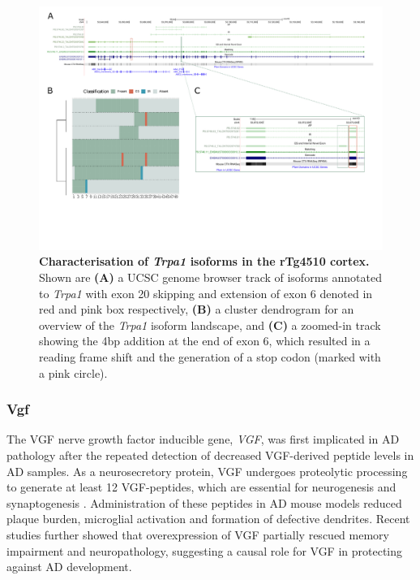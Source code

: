 \begin{landscape}
	\begin{figure}[htp]
		\centering
		\includegraphics[page=13,trim={0 5cm 0 0},scale = 0.85]{Figures/TargetGenes_Annotation_Landscape.pdf}
		\captionsetup{width=1.3\textwidth}
		\caption[Characterisation of the \textit{Trpa1} isoform landscape]%
		{\textbf{Characterisation of \textit{Trpa1} isoforms in the rTg4510 cortex.} Shown are \textbf{(A)} a UCSC genome browser track of isoforms annotated to \textit{Trpa1} with exon 20 skipping and extension of exon 6 denoted in red and pink box respectively, \textbf{(B)} a cluster dendrogram for an overview of the \textit{Trpa1} isoform landscape, and \textbf{(C)} a zoomed-in track showing the 4bp addition at the end of exon 6, which resulted in a reading frame shift and the generation of a stop codon (marked with a pink circle).}   
		\label{fig:trpa1}
	\end{figure}
\end{landscape}
\restoregeometry

\newpage
\subsubsection{Vgf}
The VGF nerve growth factor inducible gene, \textit{VGF}, was first implicated in AD pathology after the repeated detection of decreased VGF-derived peptide levels in AD samples\cite{VanSteenoven2019}. As a neurosecretory protein, VGF undergoes proteolytic processing to generate at least 12 VGF-peptides, which are essential for neurogenesis and synaptogenesis \cite{VanSteenoven2019}. Administration of these peptides in AD mouse models reduced plaque burden, microglial activation and formation of defective dendrites\cite{Quinn2021}. Recent studies further showed that overexpression of VGF partially rescued memory impairment and neuropathology, suggesting a causal role for VGF in protecting against AD development\cite{Beckmann2020}. 

